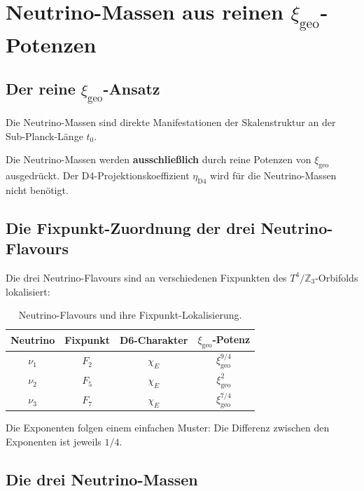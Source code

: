 \documentclass[11pt,a4paper]{article}
\newcommand{\xigeo}{\xi_{\text{geo}}}
\newcommand{\etaDfour}{\eta_{\text{D4}}}
\begin{document}
	\section{Neutrino-Massen aus reinen $\xigeo$-Potenzen}
	
	\subsection{Der reine $\xigeo$-Ansatz}
	
	\begin{tcolorbox}[colback=blue!5!white,colframe=blue!50!black,title=Zentraler Ansatz: Keine $\alpha$-Korrektur für Neutrinos]
		Die Neutrino-Massen sind direkte Manifestationen der Skalenstruktur an der Sub-Planck-Länge $t_0$. 
		
		Die Neutrino-Massen werden \textbf{ausschließlich} durch reine Potenzen von $\xigeo$ ausgedrückt. Der D4-Projektionskoeffizient $\etaDfour$ wird für die Neutrino-Massen nicht benötigt.
	\end{tcolorbox}
	
	\subsection{Die Fixpunkt-Zuordnung der drei Neutrino-Flavours}
	
	Die drei Neutrino-Flavours sind an verschiedenen Fixpunkten des $T^4/\mathbb{Z}_3$-Orbifolds lokalisiert:
	
	\begin{table}[h!]
		\centering
		\caption{Neutrino-Flavours und ihre Fixpunkt-Lokalisierung.}
		\label{tab:neutrino_fixpoints}
		\begin{tabular}{c c c c}
			\toprule
			\textbf{Neutrino} & \textbf{Fixpunkt} & \textbf{D6-Charakter} & \textbf{$\xigeo$-Potenz} \\
			\midrule
			$\nu_1$ & $F_2$ & $\chi_E$ & $\xigeo^{9/4}$ \\
			$\nu_2$ & $F_5$ & $\chi_E$ & $\xigeo^{2}$ \\
			$\nu_3$ & $F_7$ & $\chi_E$ & $\xigeo^{7/4}$ \\
			\bottomrule
		\end{tabular}
	\end{table}
	
	Die Exponenten folgen einem einfachen Muster: Die Differenz zwischen den Exponenten ist jeweils $1/4$.
	
	\subsection{Die drei Neutrino-Massen}
	
\end{document}
